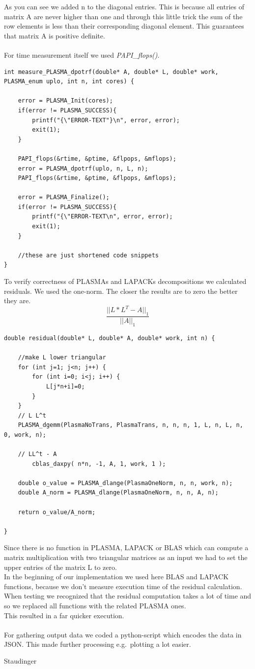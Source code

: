 \documentclass[a4paper,final,ngerman,english]{article}
\begin{document}
As you can see we added n to the diagonal entries. This is because all entries of matrix A are never higher than one and through this little trick the sum of the row elements is less than their corresponding diagonal element. This guarantees that matrix A is positive definite.\\
\ \\
For time measurement itself we used \textit{PAPI\_flops()}.
\begin{lstlisting}
int measure_PLASMA_dpotrf(double* A, double* L, double* work, PLASMA_enum uplo, int n, int cores) {

	error = PLASMA_Init(cores);
	if(error != PLASMA_SUCCESS){
		printf("{\"ERROR-TEXT"}\n", error, error);
		exit(1);
	}

	PAPI_flops(&rtime, &ptime, &flpops, &mflops);
	error = PLASMA_dpotrf(uplo, n, L, n);
	PAPI_flops(&rtime, &ptime, &flpops, &mflops);

	error = PLASMA_Finalize();
	if(error != PLASMA_SUCCESS){
		printf("{\"ERROR-TEXT\n", error, error);
		exit(1);
	}
	
	//these are just shortened code snippets
}
\end{lstlisting}

To verify correctness of PLASMAs and LAPACKs decompositions we calculated residuals.
We used the one-norm. The closer the results are to zero the better they are.\\

\[\frac{||L*L^T-A||_1}{||A||_1}\]

\begin{lstlisting}
double residual(double* L, double* A, double* work, int n) {

	//make L lower triangular
	for (int j=1; j<n; j++) {
		for (int i=0; i<j; i++) {
			L[j*n+i]=0;
		}
	}
	// L L^t
	PLASMA_dgemm(PlasmaNoTrans, PlasmaTrans, n, n, n, 1, L, n, L, n, 0, work, n);

	// LL^t - A
    	cblas_daxpy( n*n, -1, A, 1, work, 1 );

	double o_value = PLASMA_dlange(PlasmaOneNorm, n, n, work, n);
	double A_norm = PLASMA_dlange(PlasmaOneNorm, n, n, A, n);

	return o_value/A_norm;

}
\end{lstlisting}
Since there is no function in PLASMA, LAPACK or BLAS which can compute a matrix multiplication with two triangular matrices as an input we had to set the upper entries of the matrix L to zero.\\
In the beginning of our implementation we used here BLAS and LAPACK functions, because we don't measure execution time of the residual calculation. When testing we recognized that the residual computation takes a lot of time and so we replaced all functions with the related PLASMA ones.\\
This resulted in a far quicker execution.\\
\ \\
For gathering output data we coded a python-script which encodes the data in JSON\@. This made further processing e.g.\ plotting a lot easier.
\begin{flushright} Staudinger \end{flushright}
\end{document}

